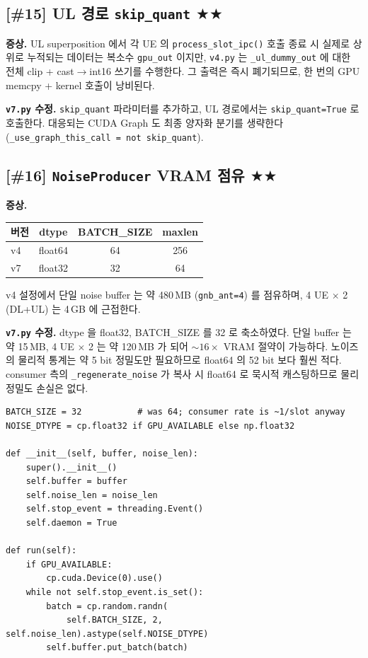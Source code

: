\documentclass[11pt,a4paper]{article}
\newcommand{\stwo}{\textcolor{starcolor}{$\bigstar\bigstar$}}
\newcommand{\vfour}{\texttt{v4.py}}
\newcommand{\vseven}{\texttt{v7.py}}
\newcommand{\bugitem}[3]{%
  \subsection{[\##1] #2 \hfill #3}%
  \vspace{-0.5em}%
}
\begin{document}
\bugitem{15}{UL 경로 \texttt{skip\_quant}}{\stwo}

\textbf{증상.} UL superposition 에서 각 UE 의 \texttt{process\_slot\_ipc()}
호출 종료 시 실제로 상위로 누적되는 데이터는 복소수 \texttt{gpu\_out} 이지만,
\vfour{} 는 \texttt{\_ul\_dummy\_out} 에 대한 전체 clip + cast$\to$int16
쓰기를 수행한다. 그 출력은 즉시 폐기되므로, 한 번의 GPU memcpy + kernel
호출이 낭비된다.

\textbf{\vseven{} 수정.} \texttt{skip\_quant} 파라미터를 추가하고,
UL 경로에서는 \texttt{skip\_quant=True} 로 호출한다. 대응되는 CUDA Graph
도 최종 양자화 분기를 생략한다 (\texttt{\_use\_graph\_this\_call = not skip\_quant}).

\bugitem{16}{\texttt{NoiseProducer} VRAM 점유}{\stwo}

\textbf{증상.}
\begin{center}
\begin{tabular}{l c c c}
\toprule
버전 & dtype & BATCH\_SIZE & maxlen \\
\midrule
v4 & float64 & 64 & 256 \\
v7 & float32 & 32 & 64 \\
\bottomrule
\end{tabular}
\end{center}
v4 설정에서 단일 noise buffer 는 약 480\,MB (\texttt{gnb\_ant=4}) 를
점유하며, 4 UE $\times$ 2 (DL+UL) 는 4\,GB 에 근접한다.

\textbf{\vseven{} 수정.} dtype 을 float32, BATCH\_SIZE 를 32 로 축소하였다.
단일 buffer 는 약 15\,MB, 4 UE $\times$ 2 는 약 120\,MB 가 되어
$\sim 16\times$ VRAM 절약이 가능하다. 노이즈의 물리적 통계는 약 5 bit
정밀도만 필요하므로 float64 의 52 bit 보다 훨씬 적다. consumer 측의
\texttt{\_regenerate\_noise} 가 복사 시 float64 로 묵시적 캐스팅하므로
물리 정밀도 손실은 없다.

\begin{lstlisting}[caption={v7.py: lines 2184--2200}]
BATCH_SIZE = 32           # was 64; consumer rate is ~1/slot anyway
NOISE_DTYPE = cp.float32 if GPU_AVAILABLE else np.float32

def __init__(self, buffer, noise_len):
    super().__init__()
    self.buffer = buffer
    self.noise_len = noise_len
    self.stop_event = threading.Event()
    self.daemon = True

def run(self):
    if GPU_AVAILABLE:
        cp.cuda.Device(0).use()
    while not self.stop_event.is_set():
        batch = cp.random.randn(
            self.BATCH_SIZE, 2, self.noise_len).astype(self.NOISE_DTYPE)
        self.buffer.put_batch(batch)
\end{lstlisting}
\end{document}
